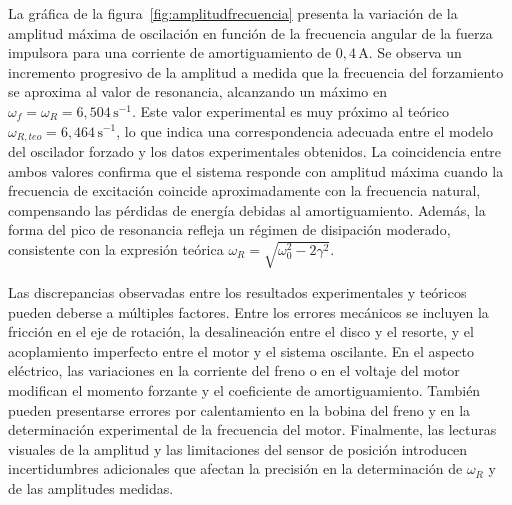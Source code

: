 La gr\'afica de la figura~\ref{fig:amplitudfrecuencia} presenta la variaci\'on de la amplitud m\'axima 
de oscilaci\'on en funci\'on de la frecuencia angular de la fuerza impulsora 
para una corriente de amortiguamiento de \(0{,}4\,\text{A}\). Se observa un 
incremento progresivo de la amplitud a medida que la frecuencia del 
forzamiento se aproxima al valor de resonancia, alcanzando un m\'aximo en 
\(\omega_f = \omega_R = 6{,}504\,\text{s}^{-1}\). Este valor experimental es muy 
pr\'oximo al te\'orico \(\omega_{R,teo} = 6{,}464\,\text{s}^{-1}\), lo que indica 
una correspondencia adecuada entre el modelo del oscilador forzado y los datos 
experimentales obtenidos. La coincidencia entre ambos valores confirma que el 
sistema responde con amplitud m\'axima cuando la frecuencia de excitaci\'on 
coincide aproximadamente con la frecuencia natural, compensando las p\'erdidas 
de energ\'ia debidas al amortiguamiento. Adem\'as, la forma del pico de 
resonancia refleja un r\'egimen de disipaci\'on moderado, consistente con la 
expresi\'on te\'orica \(\omega_R = \sqrt{\omega_0^2 - 2\gamma^2}\).

Las discrepancias observadas entre los resultados experimentales y te\'oricos 
pueden deberse a m\'ultiples factores. Entre los errores mec\'anicos se incluyen 
la fricci\'on en el eje de rotaci\'on, la desalineaci\'on entre el disco y el 
resorte, y el acoplamiento imperfecto entre el motor y el sistema oscilante. En 
el aspecto el\'ectrico, las variaciones en la corriente del freno o en el 
voltaje del motor modifican el momento forzante y el coeficiente de 
amortiguamiento. Tambi\'en pueden presentarse errores por calentamiento en la 
bobina del freno y en la determinaci\'on experimental de la frecuencia del 
motor. Finalmente, las lecturas visuales de la amplitud y las limitaciones del 
sensor de posici\'on introducen incertidumbres adicionales que afectan la 
precisi\'on en la determinaci\'on de \(\omega_R\) y de las amplitudes medidas.
